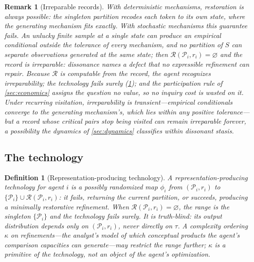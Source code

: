 \documentclass[11pt]{article}
\newtheorem{definition}[assumption]{Definition}
\newtheorem{remark}[assumption]{Remark}
\theoremstyle{definition}
\newcommand{\emptysetset}{\varnothing}
\begin{document}
\begin{remark}[Irreparable records]
\label{rem:irreparable}
With deterministic mechanisms, restoration is always possible: the singleton
partition recodes each token to its own state, where the generating
mechanism fits exactly.  With stochastic mechanisms this guarantee fails.
An unlucky finite sample at a single state can produce an empirical
conditional outside the tolerance of \emph{every} mechanism, and no
partition of $S$ can separate observations generated at the same state; then
$\mathcal R(\mathcal P_i,r_i)=\emptysetset$ and the record is
\emph{irreparable}: dissonance names a defect that no expressible refinement
can repair.  Because $\mathcal R$ is computable from the record, the agent
recognizes irreparability; the technology fails surely
(\cref{def:technology}); and the participation rule of \cref{sec:economics}
assigns the question no value, so no inquiry cost is wasted on it.  Under
recurring visitation, irreparability is transient---empirical conditionals
converge to the generating mechanism's, which lies within any positive
tolerance---but a record whose critical pairs stop being visited can remain
irreparable forever, a possibility the dynamics of \cref{sec:dynamics}
classifies within dissonant stasis.
\end{remark}

\subsection{The technology}

\begin{definition}[Representation-producing technology]
\label{def:technology}
A representation-producing technology for agent $i$ is a possibly randomized
map $\phi_i$ from $(\mathcal P_i,r_i)$ to
$\{\mathcal P_i\}\cup\mathcal R(\mathcal P_i,r_i)$: it fails, returning the
current partition, or succeeds, producing a minimally restorative
refinement.  When $\mathcal R(\mathcal P_i,r_i)=\emptysetset$, the range is
the singleton $\{\mathcal P_i\}$ and the technology fails surely.  It is \emph{truth-blind}: its output distribution depends only
on $(\mathcal P_i,r_i)$, never directly on $\tau$.  A complexity ordering
$\kappa$ on refinements---the analyst's model of which conceptual products
the agent's comparison capacities can generate---may restrict the range
further; $\kappa$ is a primitive of the technology, not an object of the
agent's optimization.
\end{definition}
\end{document}
